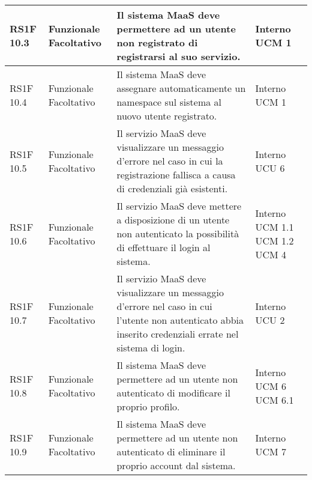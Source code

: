 \begin{center}
\begin{longtable}{ | l | p{2cm} | p{5cm} | p{1.7cm} |}
        RS1F 10.3 & Funzionale \newline  Facoltativo  & Il sistema MaaS deve permettere ad un utente non registrato di registrarsi al suo servizio. &  Interno \newline  UCM 1 \newline  \\ \hline      
        RS1F 10.4 & Funzionale \newline  Facoltativo  & Il sistema MaaS deve assegnare automaticamente un namespace sul sistema al nuovo utente registrato. &  Interno \newline  UCM 1 \newline  \\ \hline      
        RS1F 10.5 & Funzionale \newline  Facoltativo  & Il servizio MaaS deve visualizzare un messaggio d’errore nel caso in cui la registrazione fallisca a causa di credenziali già esistenti. &  Interno \newline  UCU 6 \newline  \\ \hline      
        RS1F 10.6 & Funzionale \newline  Facoltativo  & Il servizio MaaS deve mettere a disposizione di un utente non autenticato la possibilità di effettuare il login al sistema. &  Interno \newline  UCM 1.1 \newline  UCM 1.2 \newline  UCM 4 \newline  \\ \hline      
        RS1F 10.7 & Funzionale \newline  Facoltativo  & Il servizio MaaS deve visualizzare un messaggio d’errore nel caso in cui l’utente non autenticato abbia inserito credenziali errate nel sistema di login. &  Interno \newline  UCU 2 \newline  \\ \hline      
        RS1F 10.8 & Funzionale \newline  Facoltativo  & Il sistema MaaS deve permettere ad un utente non autenticato di modificare il proprio profilo. &  Interno \newline  UCM 6 \newline  UCM 6.1 \newline  \\ \hline      
        RS1F 10.9 & Funzionale \newline  Facoltativo  & Il sistema MaaS deve permettere ad un utente non autenticato di eliminare il proprio account dal sistema. &  Interno \newline  UCM 7 \newline  \\ \hline      

\end{longtable}
\end{center}
